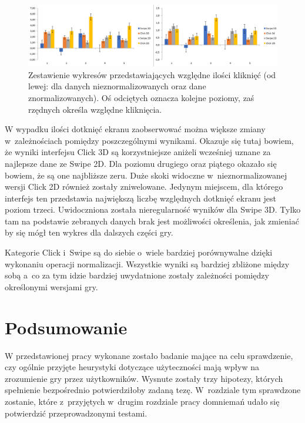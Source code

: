 \documentclass[a4paper,12pt,numbers=noenddot]{report}
\begin{document}
\begin{figure}[h!]
	\centering
  	\includegraphics[width=\linewidth]{diag/rel_mean_ClicksNorm.png}
	\caption{Zestawienie wykresów przedstawiających względne ilości kliknięć (od lewej: dla danych nieznormalizowanych oraz dane znormalizowanych). Oś odciętych oznacza kolejne poziomy, zaś rzędnych określa względne kliknięcia.}
	\label{fig:diag:rel:mean_ClicksNorm}
\end{figure}
W wypadku ilości dotknięć ekranu zaobserwować można większe zmiany w~zależnościach pomiędzy poszczególnymi wynikami. Okazuje się tutaj bowiem, że wyniki interfejsu Click 3D są korzystniejsze aniżeli wcześniej uznane za najlepsze dane ze Swipe 2D. Dla poziomu drugiego oraz piątego okazało się bowiem, że są one najbliższe zeru. Duże skoki widoczne w~nieznormalizowanej wersji Click 2D również zostały zniwelowane. Jedynym miejscem, dla którego interfejs ten przedstawia największą liczbę względnych dotknięć ekranu jest poziom trzeci.
Uwidoczniona została nieregularność wyników dla Swipe 3D. Tylko tam na podstawie zebranych danych brak jest możliwości określenia, jak zmieniać by się mógł ten wykres dla dalszych części gry.

Kategorie Click i~Swipe są do siebie o~wiele bardziej porównywalne dzięki wykonaniu operacji normalizacji. Wszystkie wyniki są bardziej zbliżone między sobą a~co za tym idzie bardziej uwydatnione zostały zależności pomiędzy określonymi wersjami gry.

\chapter{Podsumowanie}

W przedstawionej pracy wykonane zostało badanie mające na celu sprawdzenie, czy ogólnie przyjęte heurystyki dotyczące użyteczności mają wpływ na zrozumienie gry przez użytkowników. Wysnute zostały trzy hipotezy, których spełnienie bezpośrednio potwierdziłoby zadaną tezę. W~rozdziale tym sprawdzone zostanie, które z~przyjętych w~drugim rozdziale pracy domniemań udało się potwierdzić przeprowadzonymi testami.
\end{document}
